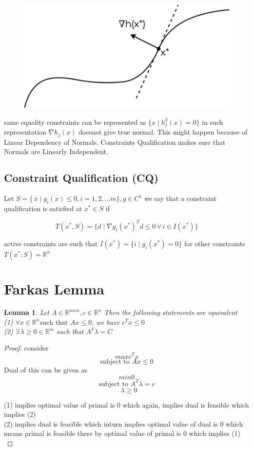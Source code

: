 \documentclass[twoside]{article}
\newtheorem{lemma}[theorem]{Lemma}
\begin{document}
\begin{figure}[h]
\center
\includegraphics[scale=0.25]{images/pic7.png}
\end{figure}

same equality constraints can be represented as $\{ x \mid h^{2}_{j}(x) = 0\}$ in such representation $\nabla h_j(x)$ doesnot give true normal. This might happen because of Linear Dependency of Normals. Constraints Qualification makes sure that Normals are Linearly Independent.



\subsection{Constraint Qualification (CQ)}
Let $S = \{\,x\mid g_{i}(x)\leq 0 , i = 1,2,...m\},g \in C^{1}  $ we say that a constraint qualification is satisfied at $x^{*}\in S$ if 

$$ T(x^{*},S) = \{d \mid \nabla g_i(x^*)^Td \leq 0\, \forall\, i \in I(x^*)\}$$

active constraints are such that 
$I(x^*)=\{i\mid g_i(x^*)=0\}$
for other constraints $T(x^*:S)= \mathbb{R}^n$

\section{Farkas Lemma}
\begin{lemma}
Let $A\in\mathbb{R}^{m x n}, c\in \mathbb{R}^{n}$ Then the following statements are equivalent \\
(1) $\forall x \in \mathbb{R}^{n} \text{such that }Ax \leq 0 $, we have $c^{T}x\leq 0 $\\
(2) $ \exists \, \lambda \geq 0 \in \mathbb{R}^{m}$ such that $A^{T}\lambda = C $ 
\end{lemma}
\begin{proof}
	consider  $$max c^{T}x $$ $$ \text{subject to } Ax \leq 0$$ Dual of this can be given as $$min 0 $$ $$ \text{subject to }A^{T}\lambda = c$$  $$\text{           }\lambda \geq 0$$

(1) implies optimal value of primal is $0$ which again, implies dual is feasible which implies (2)\\
(2) implies dual is feasible which inturn implies optimal value of dual is 0 which means primal is feasible there by optimal value of primal is 0 which implies (1)\\
\end{proof}
\end{document}

